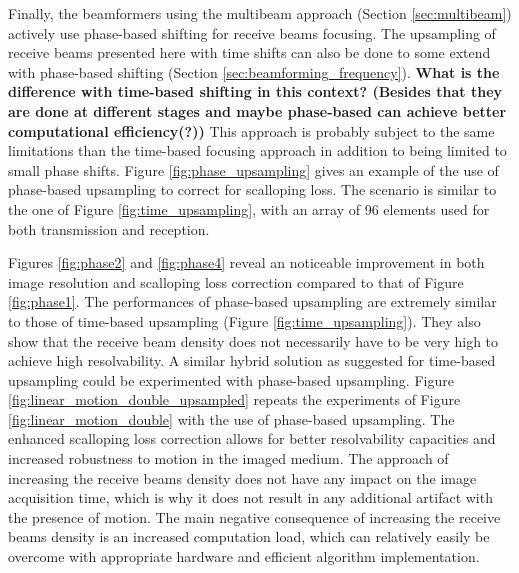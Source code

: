 Finally, the beamformers using the multibeam approach (Section \ref{sec:multibeam}) actively use phase-based shifting for receive beams focusing. The upsampling of receive beams presented here with time shifts can also be done to some extend with phase-based shifting (Section \ref{sec:beamforming_frequency}). \textbf{What is the difference with time-based shifting in this context? (Besides that they are done at different stages and maybe phase-based can achieve better computational efficiency(?))}
This approach is probably subject to the same limitations than the time-based focusing approach in addition to being limited to small phase shifts. Figure \ref{fig:phase_upsampling} gives an example of the use of phase-based upsampling to correct for scalloping loss. The scenario is similar to the one of Figure \ref{fig:time_upsampling}, with an array of 96 elements used for both transmission and reception.

Figures \ref{fig:phase2} and \ref{fig:phase4} reveal an noticeable improvement in both image resolution and scalloping loss correction compared to that of Figure \ref{fig:phase1}. The performances of phase-based upsampling are extremely similar to those of time-based upsampling (Figure \ref{fig:time_upsampling}). They also show that the receive beam density does not necessarily have to be very high to achieve high resolvability.
A similar hybrid solution as suggested for time-based upsampling could be experimented with phase-based upsampling.
Figure \ref{fig:linear_motion_double_upsampled} repeats the experiments of Figure \ref{fig:linear_motion_double} with the use of phase-based upsampling. The enhanced scalloping loss correction allows for better resolvability capacities and increased robustness to motion in the imaged medium. The approach of increasing the receive beams density does not have any impact on the image acquisition time, which is why it does not result in any additional artifact with the presence of motion. The main negative consequence of increasing the receive beams density is an increased computation load, which can relatively easily be overcome with appropriate hardware and efficient algorithm implementation.

